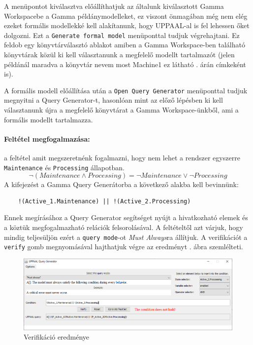 A menüpontot kiválasztva előállíthatjuk az általunk kiválasztott Gamma Workspacebe a Gamma példánymodelleket, ez viszont önmagában még nem elég ezeket formális modellekké kell alakítanunk, hogy UPPAAL-al is fel lehessen őket dolgozni. Ezt a \verb+Generate formal model+ menüponttal tudjuk végrehajtani. Ez feldob egy könyvtárválasztó ablakot amiben a Gamma Workspace-ben található könyvtárak közül ki kell választanunk a megfelelő modellt tartalmazót (jelen példánál maradva a könyvtár nevem most Machine1 ez látható . árán címkeként is).

A formális modell előállítása után a \verb+Open Query Generator+ menüponttal tudjuk megnyitni a Query Generator-t, hasonlóan mint az előző lépésben ki kell választanunk újra a megfelelő könyvtárat a Gamma Workspace-ünkből, ami a formális modellt tartalmazza.

\paragraph{Feltétel megfogalmazása: } a feltétel amit megszeretnénk fogalmazni, hogy nem lehet a rendszer egyszerre \verb+Maintenance+ és \verb+Processing+ állapotban.
\[ \neg(Maintenance  \land Processing) = \neg Maintenance \lor \neg Processing \]
A kifejezést a Gamma Query Generátorba a következő alakba kell bevinnünk:
\begin{lstlisting}
	!(Active_1.Maintenance) || !(Active_2.Processing)
\end{lstlisting}
Ennek megírásához a Query Generator segítséget nyújt a hivatkozható elemek és a köztük megfogalmazható relációk felsorolásával. A feltételtől azt várjuk, hogy mindig teljesüljön ezért a \verb+query mode+-ot \emph{Must Always}ra állítjuk. A verifikációt a \verb+verify+ gomb megnyomásával hajthatjuk végre az eredményt . ábra szemlélteti.
\begin{figure}[H]
	\centering
	\includegraphics[keepaspectratio, width=150mm]{figures/query-gen-result.png}
	\caption{Verifikáció eredménye}
	\label{fig:query-gen-res}
\end{figure}

